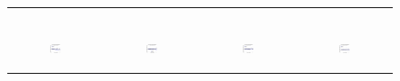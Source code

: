 \begin{figure}[ht]
\begin{tabular}{cccc}
\begin{subfigure}[b]{0.22\textwidth}
			\caption{}
			\label{appfig:partition:speedup_it2004_setcover}
	  \end{subfigure} \\
	  \begin{subfigure}[b]{0.22\textwidth}
	  	\includegraphics[width=110pt]{images_partition/diffFA_CF2G_friendster_setcover.pdf}
			\caption{}
			\label{appfig:partition:diffFA_CF2G_friendster_setcover}
	  \end{subfigure} &
	  \begin{subfigure}[b]{0.22\textwidth}
	  	\includegraphics[width=110pt]{images_partition/diffFA_CF2G_arabic2005_setcover.pdf}
			\caption{}
			\label{appfig:partition:diffFA_CF2G_arabic2005_setcover}
	  \end{subfigure} &
	  \begin{subfigure}[b]{0.22\textwidth}
	  	\includegraphics[width=110pt]{images_partition/diffFA_CF2G_uk2005_setcover.pdf}
			\caption{}
			\label{appfig:partition:diffFA_CF2G_uk2005_setcover}
	  \end{subfigure} &
	  \begin{subfigure}[b]{0.22\textwidth}
	  	\includegraphics[width=110pt]{images_partition/diffFA_CF2G_it2004_setcover.pdf}

\end{subfigure}
\end{tabular}
\end{figure}
